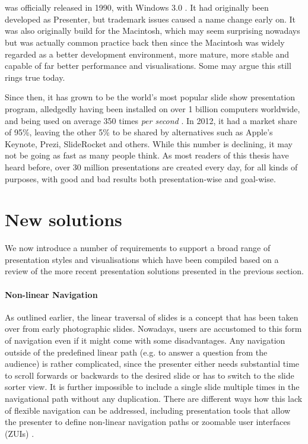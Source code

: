   \section{\ppt*}

   \ppt* was officially released in 1990, with Windows 3.0 \citep{austin-1}. It
   had originally been developed as Presenter, but trademark issues caused a
   name change early on. It was also originally build for the Macintosh, which
   may seem surprising nowadays but was actually common practice back then
   since the Macintosh was widely regarded as a better development environment,
   more mature, more stable and capable of far better performance and
   visualisations. Some may argue this still rings true today.

   Since then, it has grown to be the world's most popular slide show
   presentation program, alledgedly having been installed on over 1 billion
   computers worldwide, and being used on average 350 times \emph{per second}
   \citep{parks-1}. In 2012, it had a market share of 95\%, leaving the other
   5\% to be shared by alternatives such as Apple's Keynote, Prezi, SlideRocket
   and others. While this number is declining, it may not be going as fast as
   many people think. As most readers of this thesis have heard before, over 30
   million \ppt presentations are created every day, for all kinds of purposes,
   with good and bad results both presentation-wise and goal-wise.


  \section{New solutions}

   We now introduce a number of requirements to support a broad range of
   presentation styles and visualisations which have been compiled based on a
   review of the more recent presentation solutions presented in the previous
   section.

     \paragraph{Non-linear Navigation} As outlined earlier, the linear
      traversal of slides is a concept that has been taken over from early
      photographic slides. Nowadays, users are accustomed to this form of
      navigation even if it might come with some disadvantages. Any navigation
      outside of the predefined linear path (e.g. to answer a question from the
      audience) is rather complicated, since the presenter either needs
      substantial time to scroll forwards or backwards to the desired slide or
      has to switch to the slide sorter view. It is further impossible to
      include a single slide multiple times in the navigational path without
      any duplication. There are different ways how this lack of flexible
      navigation can be addressed, including presentation tools that allow the
      presenter to define non-linear navigation paths \citep{spicer-1}
      \citep{edge-1} or zoomable user interfaces (ZUIs) \citep{good-1}
      \citep{lichtschlag-1} \citep{haller-1}.

